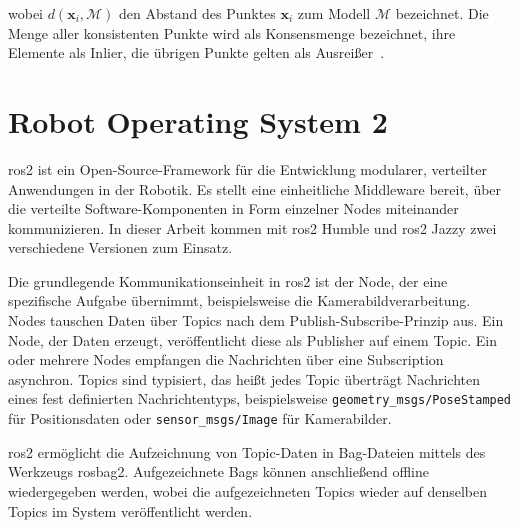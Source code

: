wobei $d(\mathbf{x}_i, \mathcal{M})$ den Abstand des Punktes $\mathbf{x}_i$ zum Modell $\mathcal{M}$ bezeichnet.
Die Menge aller konsistenten Punkte wird als Konsensmenge bezeichnet, ihre Elemente als Inlier, die übrigen Punkte gelten als Ausreißer~\cite{RANSAC_Fischler1981}.


\section{Robot Operating System 2}
\label{sec:ros2}

\gls{ros2} ist ein Open-Source-Framework für die Entwicklung modularer, verteilter Anwendungen in der Robotik.
Es stellt eine einheitliche Middleware bereit, über die verteilte Software-Komponenten in Form einzelner Nodes miteinander kommunizieren.
In dieser Arbeit kommen mit \gls{ros2} Humble und \gls{ros2} Jazzy zwei verschiedene Versionen zum Einsatz.~\cite{ROS2MiddlewareHumble}


Die grundlegende Kommunikationseinheit in \gls{ros2} ist der Node, der eine spezifische Aufgabe übernimmt, 
beispielsweise die Kamerabildverarbeitung.
Nodes tauschen Daten über Topics nach dem Publish-Subscribe-Prinzip aus.
Ein Node, der Daten erzeugt, veröffentlicht diese als Publisher auf einem Topic. 
Ein oder mehrere Nodes empfangen die Nachrichten über eine Subscription asynchron.
Topics sind typisiert, das heißt jedes Topic überträgt Nachrichten eines fest definierten Nachrichtentyps, beispielsweise 
\texttt{geometry\_msgs/PoseStamped} für Positionsdaten oder \texttt{sensor\_msgs/Image} für Kamerabilder.~\cite{ROS2Nodes,ROS2Topics}


\gls{ros2} ermöglicht die Aufzeichnung von Topic-Daten in Bag-Dateien mittels des Werkzeugs rosbag2.
Aufgezeichnete Bags können anschließend offline wiedergegeben werden, wobei die aufgezeichneten Topics wieder auf denselben Topics im System veröffentlicht werden.~\cite{ROS2Rosbag2}




